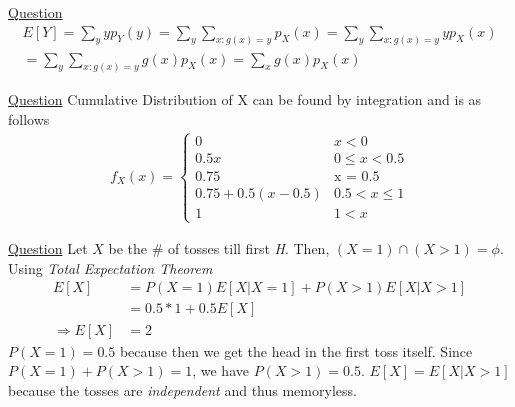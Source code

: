 \documentclass[../probability-notes.tex]{subfiles}
\begin{document}
\begin{enumerate}
        \hypertarget{a_expfn}{\item} \hyperlink{q_expfn}{Question}
        \begin{align*}
            E[Y] = \sum_{y}yp_Y(y) = \sum_{y}\sum_{x:g(x)=y}p_{X}(x) = \sum_{y} \sum_{x:g(x)=y} yp_{X}(x)\\
            = \sum_{y} \sum_{x:g(x)=y}g(x)p_{X}(x) = \sum_{x}g(x)p_{X}(x) 
        \end{align*}
    
        \hypertarget{a_cumuldistfn}{\item} \hyperlink{q_cumuldistfn}{Question} \newline
        Cumulative Distribution of X can be found by integration and is as follows
        \begin{align*}
            f_{X}(x) = \begin{cases} 0 &\mbox{$x < 0$}\\
                                     0.5x &\mbox{$0 \leq x < 0.5$}\\
                                     0.75 &\mbox{x = 0.5}\\
                                     0.75 + 0.5(x-0.5) &\mbox{$0.5 < x \leq 1$} \\
                                     1 &\mbox {$1 < x$}\end{cases}
        \end{align*}
        
        \hypertarget{a_tossh}{\item} \hyperlink{q_tossh}{Question} \newline
        Let $X$ be the \# of tosses till first \emph{H}. Then, $(X = 1) \cap (X > 1) = \phi$.
        Using \emph{Total Expectation Theorem}
        \begin{align*}
            E[X] &= P(X = 1)E[X|X = 1] + P(X > 1)E[X|X > 1] \\
            &= 0.5 * 1 + 0.5 E[X] \\
            \Rightarrow E[X] &= 2
        \end{align*}
        $P(X = 1) = 0.5$ because then we get the head in the first toss itself. Since $P(X = 1) + P(X > 1) = 1$, we have $P(X > 1) = 0.5$. $E[X] = E[X|X > 1]$ because the tosses are \emph{independent} and thus memoryless.


\end{enumerate}
\end{document}
